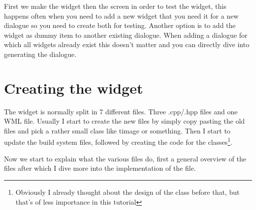 \documentclass[a4paper,notitlepage]{report}
\begin{document}
First we make the widget then the screen in order to test the widget, this
happens often when you need to add a new widget that you need it for a new
dialogue so you need to create both for testing. Another option is to add the
widget as dummy item to another existing dialogue. When adding a dialogue for
which all widgets already exist this doesn't matter and you can directly dive
into generating the dialogue.

\section{Creating the widget}
\label{creating_the_widget}

The widget is normally split in 7 different files. Three .cpp/.hpp files and one
WML file. Usually I start to create the new files by simply copy pasting the old
files and pick a rather small class like timage or something. Then I start to
update the build system files, followed by creating the code for the
classes\footnote{Obviously I already thought about the design of the class
before that, but that's of less importance in this tutorial}.

Now we start to explain what the various files do, first a general overview of
the files after which I dive more into the implementation of the file.
\end{document}
